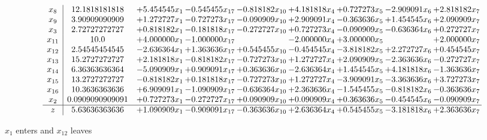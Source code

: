 \documentclass[10pt]{article}
\begin{document}
 \[\begin{array}{c| c c@{\hskip 2pt} c@{\hskip 2pt} c@{\hskip 2pt} c@{\hskip 2pt} c@{\hskip 2pt} c@{\hskip 2pt} c@{\hskip 2pt} }
 x_{8}   &  12.1818181818 & + 5.454545 x_{1} & -0.545455 x_{17} & -0.818182 x_{10} & + 4.181818 x_{4} & + 0.727273 x_{5} & -2.909091 x_{6} & + 2.818182 x_{7}\\
 x_{9}   &  3.90909090909 & + 1.272727 x_{1} & -0.727273 x_{17} & -0.090909 x_{10} & + 2.909091 x_{4} & -0.363636 x_{5} & + 1.454545 x_{6} & + 2.090909 x_{7}\\
 x_{3}   &  2.72727272727 & + 0.818182 x_{1} & -0.181818 x_{17} & -0.272727 x_{10} & + 0.727273 x_{4} & -0.090909 x_{5} & -0.636364 x_{6} & + 0.272727 x_{7}\\
 x_{11}   &  10.0 & + 4.000000 x_{1} & -1.000000 x_{17} &   & -2.000000 x_{4} & + 3.000000 x_{5} &   & + 2.000000 x_{7}\\
 x_{12}   &  2.54545454545 & -2.636364 x_{1} & + 1.363636 x_{17} & + 0.545455 x_{10} & -0.454545 x_{4} & -3.818182 x_{5} & + 2.272727 x_{6} & + 0.454545 x_{7}\\
 x_{13}   &  15.2727272727 & + 2.181818 x_{1} & -0.818182 x_{17} & -0.727273 x_{10} & + 1.272727 x_{4} & + 2.090909 x_{5} & -2.363636 x_{6} & -0.272727 x_{7}\\
 x_{14}   &  6.36363636364 & -5.090909 x_{1} & + 0.909091 x_{17} & + 0.363636 x_{10} & -2.636364 x_{4} & + 1.454545 x_{5} & + 4.181818 x_{6} & -1.363636 x_{7}\\
 x_{15}   &  13.2727272727 & -0.818182 x_{1} & + 0.181818 x_{17} & -0.727273 x_{10} & + 1.272727 x_{4} & -3.909091 x_{5} & -3.363636 x_{6} & + 3.727273 x_{7}\\
 x_{16}   &  10.3636363636 & + 6.909091 x_{1} & -1.090909 x_{17} & -0.636364 x_{10} & + 2.363636 x_{4} & -1.545455 x_{5} & -0.818182 x_{6} & -0.363636 x_{7}\\
 x_{2}   &  0.0909090909091 & + 0.727273 x_{1} & -0.272727 x_{17} & + 0.090909 x_{10} & + 0.090909 x_{4} & + 0.363636 x_{5} & -0.454545 x_{6} & -0.090909 x_{7}\\
\hline
z    &  5.63636363636 & + 1.090909 x_{1} & -0.909091 x_{17} & -0.363636 x_{10} & + 2.636364 x_{4} & + 0.545455 x_{5} & -3.181818 x_{6} & + 2.363636 x_{7}\\
\end{array}\]


 $ x_{1} $ enters and $ x_{12} $ leaves 
\end{document}
